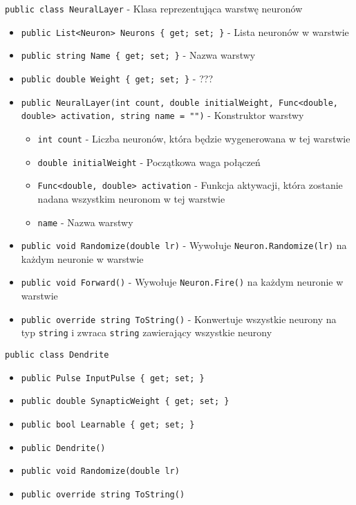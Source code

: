 \documentclass[12pt,a4paper]{article}
\begin{document}
\lstinline{public class NeuralLayer} - Klasa reprezentująca warstwę neuronów
\begin{itemize}
    \item \lstinline|public List<Neuron> Neurons { get; set; }| - Lista neuronów w warstwie
    \item \lstinline|public string Name { get; set; }| - Nazwa warstwy
    \item \lstinline|public double Weight { get; set; }| - ???
    \item \lstinline|public NeuralLayer(int count, double initialWeight, Func<double, double> activation, string name = "")| - Konstruktor warstwy
          \begin{itemize}
              \item \lstinline{int count} - Liczba neuronów, która będzie wygenerowana w tej warstwie
              \item \lstinline{double initialWeight} - Początkowa waga połączeń
              \item \lstinline{Func<double, double> activation} - Funkcja aktywacji, która zostanie nadana wszystkim neuronom w tej warstwie
              \item \lstinline{name} - Nazwa warstwy
          \end{itemize}
    \item \lstinline|public void Randomize(double lr)| - Wywołuje \lstinline{Neuron.Randomize(lr)} na każdym neuronie w warstwie
    \item \lstinline|public void Forward()| - Wywołuje \lstinline{Neuron.Fire()} na każdym neuronie w warstwie
    \item \lstinline|public override string ToString()| - Konwertuje wszystkie neurony na typ \lstinline{string} i zwraca \lstinline{string} zawierający wszystkie neurony
\end{itemize}


\lstinline{public class Dendrite}
\begin{itemize}
    \item \lstinline|public Pulse InputPulse { get; set; }|
    \item \lstinline|public double SynapticWeight { get; set; }|
    \item \lstinline|public bool Learnable { get; set; }|
    \item \lstinline|public Dendrite()|
    \item \lstinline|public void Randomize(double lr)|
    \item \lstinline|public override string ToString()|
\end{itemize}
\end{document}
